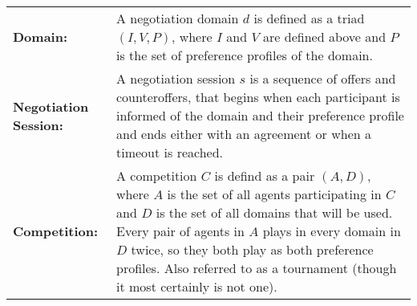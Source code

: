 \begin{longtable}{l p{290pt}}
                \textbf{Domain:} & A negotiation domain $d$ is defined as a triad $(I, V, P)$, where $I$ and $V$ are defined above and $P$ is the set of preference profiles of the domain\protect\footnotemark.\\

                \textbf{Negotiation Session:} & A negotiation session $s$ is a sequence of offers and counteroffers, that begins when each participant is informed of the domain and their preference profile and ends either with an agreement or when a timeout is reached. \\

                \textbf{Competition:} & A competition $C$ is defind as a pair $(A, D)$, where $A$ is the set of all agents participating in $C$ and $D$ is the set of all domains that will be used. Every pair of agents in $A$ plays in every domain in $D$ twice, so they both play as both preference profiles. Also referred to as a tournament (though it most certainly is not one).\\

        \end{longtable}

